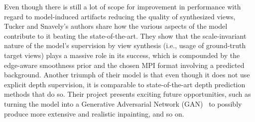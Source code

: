 Even though there is still a lot of scope for improvement in performance with regard to model-induced artifacts reducing the quality of synthesized views, Tucker and Snavely's authors share how the various aspects of the model contribute to it beating the state-of-the-art. They show that the scale-invariant nature of the model's supervision by view synthesis (i.e., usage of ground-truth target views) plays a massive role in its success, which is compounded by the edge-aware smoothness prior and the chosen MPI format involving a predicted background. Another triumph of their model is that even though it does not use explicit depth supervision, it is comparable to state-of-the-art depth prediction methods that do so. Their project presents exciting future opportunities, such as turning the model into a Generative Adversarial Network (GAN)~\cite{goodfellow_generative_2014} to possibly produce more extensive and realistic inpainting, and so on.